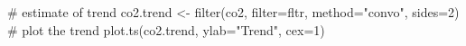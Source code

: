 \begin{Schunk}
\begin{Sinput}
 # estimate of trend
 co2.trend <- filter(co2, filter=fltr, method="convo", sides=2)
 # plot the trend
 plot.ts(co2.trend, ylab="Trend", cex=1)
\end{Sinput}
\end{Schunk}
